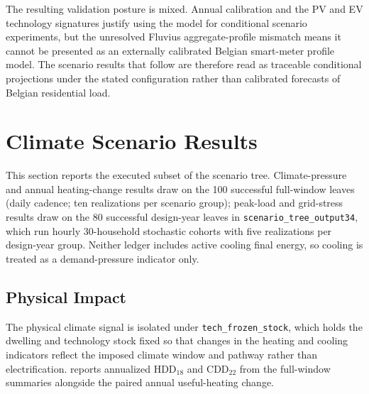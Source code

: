 The resulting validation posture is mixed. Annual calibration and the PV and EV technology signatures justify using the model for conditional scenario experiments, but the unresolved Fluvius aggregate-profile mismatch means it cannot be presented as an externally calibrated Belgian smart-meter profile model. The scenario results that follow are therefore read as traceable conditional projections under the stated configuration rather than calibrated forecasts of Belgian residential load.


\pagebreak
\section{Climate Scenario Results}
\label{sec:climateScenarioResults}

This section reports the executed subset of the scenario tree. Climate-pressure and annual heating-change results draw on the 100 successful full-window leaves (daily cadence; ten realizations per scenario group); peak-load and grid-stress results draw on the 80 successful design-year leaves in \texttt{scenario\_tree\_output34}, which run hourly 30-household stochastic cohorts with five realizations per design-year group. Neither ledger includes active cooling final energy, so cooling is treated as a demand-pressure indicator only.


\subsection{Physical Impact}
\label{sec:physicalImpact}

The physical climate signal is isolated under \texttt{tech\_frozen\_stock},
which holds the dwelling and technology stock fixed so that changes in the
heating and cooling indicators reflect the imposed climate window and pathway
rather than electrification.  reports
annualized HDD$_{18}$ and CDD$_{22}$ from the full-window summaries alongside
the paired annual useful-heating change.

